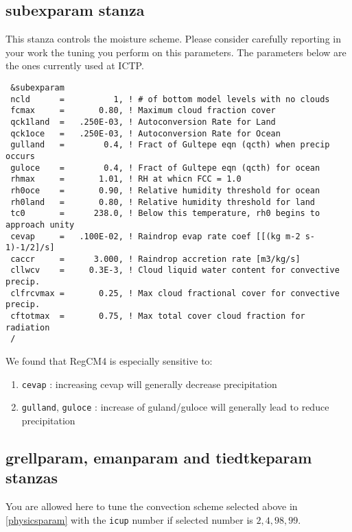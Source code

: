 \subsection{subexparam stanza}

This stanza controls the moisture scheme. Please consider carefully reporting
in your work the tuning you perform on this parameters. The parameters below
are the ones currently used at ICTP.

{\footnotesize
\begin{Verbatim}
 &subexparam
 ncld      =          1, ! # of bottom model levels with no clouds
 fcmax     =       0.80, ! Maximum cloud fraction cover
 qck1land  =   .250E-03, ! Autoconversion Rate for Land
 qck1oce   =   .250E-03, ! Autoconversion Rate for Ocean
 gulland   =        0.4, ! Fract of Gultepe eqn (qcth) when precip occurs
 guloce    =        0.4, ! Fract of Gultepe eqn (qcth) for ocean
 rhmax     =       1.01, ! RH at whicn FCC = 1.0
 rh0oce    =       0.90, ! Relative humidity threshold for ocean
 rh0land   =       0.80, ! Relative humidity threshold for land
 tc0       =      238.0, ! Below this temperature, rh0 begins to approach unity
 cevap     =   .100E-02, ! Raindrop evap rate coef [[(kg m-2 s-1)-1/2]/s]
 caccr     =      3.000, ! Raindrop accretion rate [m3/kg/s]
 cllwcv    =     0.3E-3, ! Cloud liquid water content for convective precip.
 clfrcvmax =       0.25, ! Max cloud fractional cover for convective precip.
 cftotmax  =       0.75, ! Max total cover cloud fraction for radiation
 /
\end{Verbatim}
}

We found that RegCM4 is especially sensitive to:

\begin{enumerate}
\item \verb=cevap= : increasing cevap will generally decrease precipitation
\item \verb=gulland=, \verb=guloce= : increase of guland/guloce will generally
lead to reduce precipitation
\end{enumerate}

\subsection{grellparam, emanparam and tiedtkeparam stanzas}

You are allowed here to tune the convection scheme selected above in
\ref{physicsparam} with the \verb=icup= number if selected number is
$2, 4, 98, 99$. 


